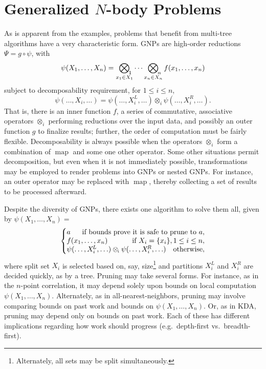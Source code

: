 \documentclass[twoside,leqno,twocolumn]{article}
\DeclareMathOperator*{\map}{map}
\newcommand{\GenOp}[1]{\mathop{\bigotimes\nolimits_{\lefteqn{\scriptstyle \!#1}}}}
\newcommand{\genop}[1]{\mathbin{\otimes_{\scriptscriptstyle \!#1}}}
\newcommand{\comp}{\mathbin{\circ}}
\newcommand{\Gnp}{\Psi}
\newcommand{\gnp}{\psi}
\newcommand{\kdleft}[1]{#1^{\!L}}
\newcommand{\kdright}[1]{#1^{\!R}}
\begin{document}
\section{Generalized $N$-body Problems}
As is apparent from the examples, problems that benefit from
multi-tree algorithms have a very characteristic form.  GNPs are
high-order reductions $\Gnp = g \comp \gnp$, with
\begin{equation}
  \gnp(X_1,\ldots,X_n) = \GenOp{1}_{x_1 \in X_1} \cdots \GenOp{n}_{x_n \in X_n} f(x_1,\ldots,x_n)
\end{equation}
subject to decomposability requirement, for $1 \leq i \leq n$,
\begin{equation}
  \gnp(\ldots,X_i,\ldots) = \gnp(\ldots,\kdleft{X_i},\ldots) \genop{i} \gnp(\ldots,\kdright{X_i},\ldots) .
\end{equation}
That is, there is an inner function $f$, a series of commutative,
associative operators $\genop{i}$ performing reductions over the input
data, and possibly an outer function $g$ to finalize results; further,
the order of computation must be fairly flexible.  Decomposability is
always possible when the operators $\genop{i}$ form a combination of
$\map$ and some one other operator.  Some other situations permit
decomposition, but even when it is not immediately possible,
transformations may be employed to render problems into GNPs or nested
GNPs.  For instance, an outer operator may be replaced with $\map$,
thereby collecting a set of results to be processed afterward.

Despite the diversity of GNPs, there exists one algorithm to solve
them all, given by $\gnp(X_1,\ldots,X_n) =$
\begin{equation}
  \left\{ \!\!\! \begin{array}{lrrr}
    a & \multicolumn{3}{r}{\text{if bounds prove it is safe to prune to $a$},} \\
    \multicolumn{2}{l}{f(x_1,\ldots,x_n)} & \multicolumn{2}{r}{\text{if } X_i = \{x_i\}, 1 \leq i \leq n,} \\
    \multicolumn{3}{l}{\gnp(\ldots,\kdleft{X_i},\ldots) \genop{i} \gnp(\ldots,\kdright{X_i},\ldots)} & \text{otherwise},
  \end{array} \!\!\! \right.
\end{equation}
where split set $X_i$ is selected based on, say,
size\footnote{Alternately, all sets may be split simultaneously.} and
partitions $\kdleft{X_i}$ and $\kdright{X_i}$ are decided quickly, as
by a tree.  Pruning may take several forms.  For instance, as in the
$n$-point correlation, it may depend solely upon bounds on local
computation $\psi(X_1,\ldots,X_n)$.  Alternately, as in
all-nearest-neighbors, pruning may involve comparing bounds on past
work and bounds on $\psi(X_1,\ldots,X_n)$.  Or, as in KDA, pruning may
depend only on bounds on past work.  Each of these has different
implications regarding how work should progress (e.g.~depth-first
vs.~breadth-first).
\end{document}
